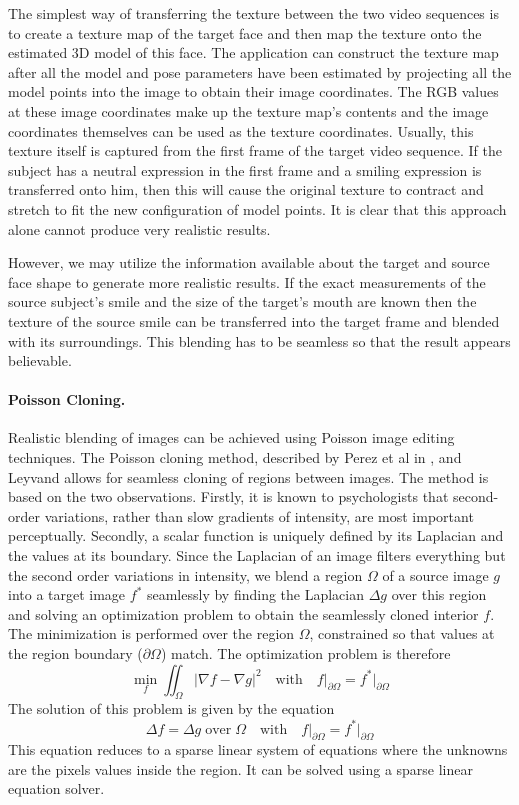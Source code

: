 \documentclass[11pt,a4paper,twoside]{report}
\begin{document}
The simplest way of transferring the texture between the two
video sequences is to create a texture map of the target face and then map
the texture onto the estimated 3D model of this face. The application can
construct the texture map after all the model and pose parameters have been
estimated by projecting all the model points into the image to obtain their
image coordinates. The RGB values at these image coordinates make up the texture
map's contents and the image coordinates themselves can be used as the texture
coordinates. Usually, this texture itself is captured from the first frame of the
target video sequence. If the subject has a neutral expression in the first frame and a smiling expression is
transferred onto him, then this will cause the original texture to contract and
stretch to fit the new configuration of model points. It is clear that this
approach alone cannot produce very realistic results. 

However, we may utilize the information available about the target and source
face shape to generate more realistic results. If the exact measurements of the
source subject's smile and the size of the target's mouth are known then the texture
of the source smile can be transferred into the target frame and blended with its
surroundings. This blending has to be seamless so that the result appears believable. 

\paragraph{Poisson Cloning.} Realistic blending of images can be achieved using
Poisson image editing techniques. The Poisson cloning method, described by Perez
et al in \cite{perez}, and Leyvand \cite{poisson} allows for seamless cloning of
regions between images.
The method is based on the two observations. Firstly, it is known to
psychologists \cite{perez} that second-order variations, rather than
slow gradients of intensity, are most important perceptually. Secondly, a scalar
function is uniquely defined by its Laplacian and the values at its
boundary. Since the Laplacian of an image filters everything but the second
order variations in intensity, we blend a region $\Omega$ of a source image $g$ into a
target image $f^*$ seamlessly
by finding the Laplacian $\Delta g$ over this region and solving an optimization
problem to obtain the seamlessly cloned interior $f$. The minimization is
performed over the region $\Omega$, constrained so that values at the region boundary
($\partial \Omega$) match. The optimization problem is therefore 
\begin{equation}
\mathop{min}_f \iint_{\Omega} \vert \nabla f  - \nabla g \vert^2 \quad \mathrm{with} \quad
f\vert_{\partial \Omega} = f^*\vert_{\partial \Omega}
\end{equation}
The solution of this problem is given by the equation
\begin{equation}
\Delta f = \Delta g \; \mathrm{over} \; \Omega \quad \mathrm{with} \quad
f\vert_{\partial \Omega} = f^*\vert_{\partial \Omega}
\end{equation}
This equation reduces to a sparse linear system of equations where the unknowns are the
pixels values inside the region. It can be solved using a sparse linear equation
solver.
\end{document}
